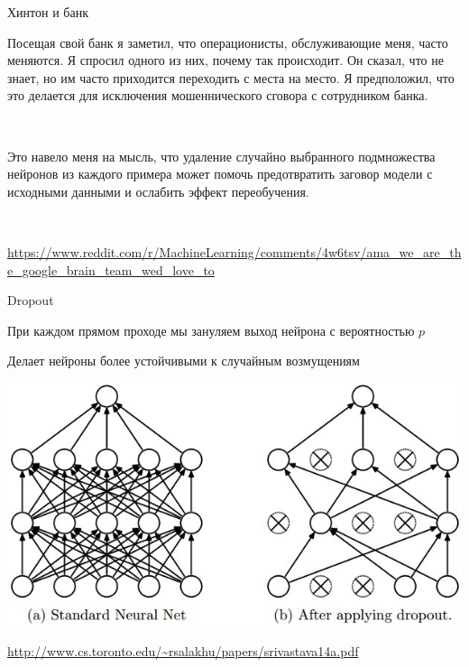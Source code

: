 \documentclass[notes,12pt, aspectratio=169]{beamer}
\newenvironment{wideitemize}{\itemize\addtolength{\itemsep}{10pt}}{\enditemize}
\begin{document}
\begin{frame}{Хинтон и банк}
	
	Посещая свой банк я заметил, что операционисты, обслуживающие меня, часто меняются. Я спросил одного из них, почему так происходит. Он сказал, что не знает, но им часто приходится переходить с места на место. Я предположил, что это делается для исключения мошеннического сговора с сотрудником банка. 
	
	\par \mbox{ } \par 
	
	Это навело меня на мысль, что \alert{удаление случайно выбранного подмножества нейронов}  из каждого примера может помочь \alert{предотвратить заговор модели с исходными данными} и ослабить эффект переобучения. 
	
	\par \mbox{ } \par 
	
	\vfill %
	\footnotesize
	{\color{blue} \url{https://www.reddit.com/r/MachineLearning/comments/4w6tsv/ama_we_are_the_google_brain_team_wed_love_to}}
\end{frame}


\begin{frame}{Dropout}
	\begin{wideitemize}	
		\item При каждом прямом проходе мы зануляем выход нейрона с вероятностью $p$ 
		\item Делает нейроны более устойчивыми к случайным возмущениям
	\end{wideitemize}
	
	\begin{center}
		\includegraphics[width=0.5\paperwidth]{dropout2.png}
	\end{center}
	
	\vfill %
	\footnotesize
	{\color{blue} \url{http://www.cs.toronto.edu/~rsalakhu/papers/srivastava14a.pdf}}
\end{frame}
\end{document}
